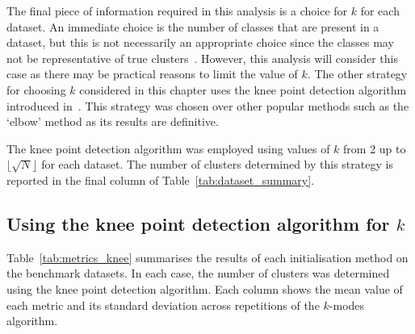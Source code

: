 The final piece of information required in this analysis is a choice for \(k\)
for each dataset. An immediate choice is the number of classes that are present
in a dataset, but this is not necessarily an appropriate choice since the
classes may not be representative of true clusters~\cite{Memoli2011}. However,
this analysis will consider this case as there may be practical reasons to limit
the value of \(k\). The other strategy for choosing \(k\) considered in this
chapter uses the knee point detection algorithm introduced
in~\cite{Satopaa2011}. This strategy was chosen over other popular methods such
as the `elbow' method as its results are definitive.

The knee point detection algorithm was employed using values of \(k\) from 2 up
to \(\lfloor\sqrt N\rfloor\) for each dataset. The number of clusters determined
by this strategy is reported in the final column of
Table~\ref{tab:dataset_summary}.


\subsection{Using the knee point detection algorithm for \(k\)}
\label{subsec:knee}

Table~\ref{tab:metrics_knee} summarises the results of each initialisation
method on the benchmark datasets. In each case, the number of clusters was
determined using the knee point detection algorithm. Each column shows the mean
value of each metric and its standard deviation across
repetitions of the \(k\)-modes
algorithm.

